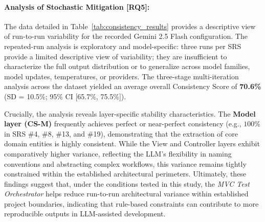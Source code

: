 \paragraph{Analysis of Stochastic Mitigation [RQ5]:}
The data detailed in Table~\ref{tab:consistency_results} provides a descriptive view of run-to-run variability for the recorded Gemini 2.5 Flash configuration. The repeated-run analysis is exploratory and model-specific: three runs per SRS provide a limited descriptive view of variability; they are insufficient to characterize the full output distribution or to generalize across model families, model updates, temperatures, or providers. The three-stage multi-iteration analysis across the dataset yielded an average overall Consistency Score of \textbf{70.6\%} (SD = 10.5\%; 95\% CI [65.7\%, 75.5\%]). 

Crucially, the analysis reveals layer-specific stability characteristics. The \textbf{Model layer (CS-M)} frequently achieves perfect or near-perfect consistency (e.g., $100\%$ in SRS \#4, \#8, \#13, and \#19), demonstrating that the extraction of core domain entities is highly consistent. While the View and Controller layers exhibit comparatively higher variance, reflecting the LLM's flexibility in naming conventions and abstracting complex workflows, this variance remains tightly constrained within the established architectural perimeters. Ultimately, these findings suggest that, under the conditions tested in this study, the \textit{MVC Test Orchestrator} helps reduce run-to-run architectural variance within established project boundaries, indicating that rule-based constraints can contribute to more reproducible outputs in LLM-assisted development.